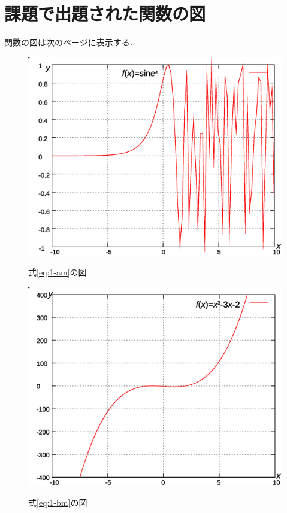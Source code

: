 \documentclass[12pt]{jarticle}
\renewcommand  \[  {\begin{eqnarray}}
\renewcommand  \]  {\end{eqnarray}}
\begin{document}
\section{課題で出題された関数の図}
関数の図は次のページに表示する．
\begin{figure}[p]
\begin{minipage}{7.95cm}
\center
\includegraphics[scale=0.38]{graph1a.eps}
\caption{式\ref{eq:1-am}の図}
\label{fig:1-am}
\includegraphics[scale=0.38]{graph2.eps}
\caption{式\ref{eq:1-bm}の図}
\label{fig:1-bm}
\end{minipage}
\begin{minipage}{7.95cm}
\center

\end{minipage}
\end{figure}
\end{document}
